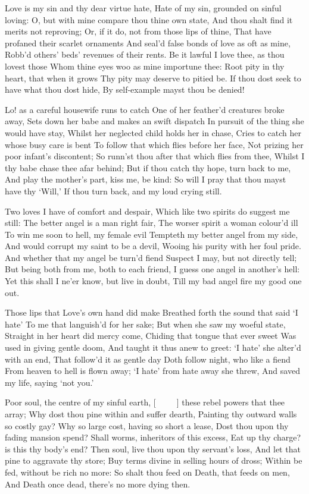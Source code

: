 \documentclass[twocolumn]{book}
\begin{document}
Love is my sin and thy dear virtue hate,
Hate of my sin, grounded on sinful loving:
O, but with mine compare thou thine own state,
And thou shalt find it merits not reproving;
Or, if it do, not from those lips of thine,
That have profaned their scarlet ornaments
And seal'd false bonds of love as oft as mine,
Robb'd others' beds' revenues of their rents.
Be it lawful I love thee, as thou lovest those
Whom thine eyes woo as mine importune thee:
Root pity in thy heart, that when it grows
Thy pity may deserve to pitied be.
  If thou dost seek to have what thou dost hide,
  By self-example mayst thou be denied!


Lo! as a careful housewife runs to catch
One of her feather'd creatures broke away,
Sets down her babe and makes an swift dispatch
In pursuit of the thing she would have stay,
Whilst her neglected child holds her in chase,
Cries to catch her whose busy care is bent
To follow that which flies before her face,
Not prizing her poor infant's discontent;
So runn'st thou after that which flies from thee,
Whilst I thy babe chase thee afar behind;
But if thou catch thy hope, turn back to me,
And play the mother's part, kiss me, be kind:
  So will I pray that thou mayst have thy `Will,'
  If thou turn back, and my loud crying still.

Two loves I have of comfort and despair,
Which like two spirits do suggest me still:
The better angel is a man right fair,
The worser spirit a woman colour'd ill
To win me soon to hell, my female evil
Tempteth my better angel from my side,
And would corrupt my saint to be a devil,
Wooing his purity with her foul pride.
And whether that my angel be turn'd fiend
Suspect I may, but not directly tell;
But being both from me, both to each friend,
I guess one angel in another's hell:
  Yet this shall I ne'er know, but live in doubt,
  Till my bad angel fire my good one out.


Those lips that Love's own hand did make
Breathed forth the sound that said `I hate'
To me that languish'd for her sake;
But when she saw my woeful state,
Straight in her heart did mercy come,
Chiding that tongue that ever sweet
Was used in giving gentle doom,
And taught it thus anew to greet:
`I hate' she alter'd with an end,
That follow'd it as gentle day
Doth follow night, who like a fiend
From heaven to hell is flown away;
  `I hate' from hate away she threw,
  And saved my life, saying `not you.'


Poor soul, the centre of my sinful earth,
[\ \ \ \ \ ] these rebel powers that thee array;
Why dost thou pine within and suffer dearth,
Painting thy outward walls so costly gay?
Why so large cost, having so short a lease,
Dost thou upon thy fading mansion spend?
Shall worms, inheritors of this excess,
Eat up thy charge? is this thy body's end?
Then soul, live thou upon thy servant's loss,
And let that pine to aggravate thy store;
Buy terms divine in selling hours of dross;
Within be fed, without be rich no more:
  So shalt thou feed on Death, that feeds on men,
  And Death once dead, there's no more dying then.
\end{document}

